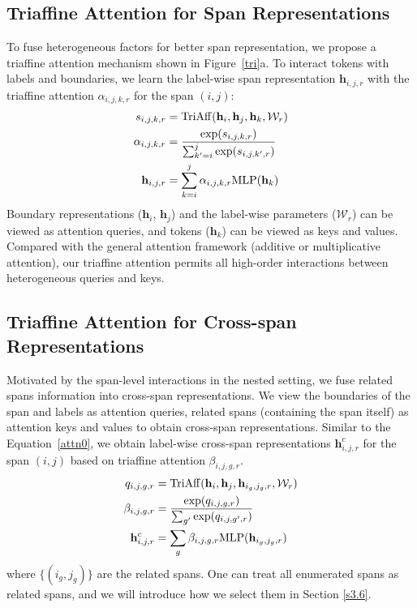 \documentclass[11pt]{article}
\begin{document}
\subsection{Triaffine Attention for Span Representations} \label{triaffine}

To fuse heterogeneous factors for better span representation, we propose a triaffine attention mechanism shown in Figure~\ref{tri}a. 
To interact tokens with labels and boundaries, we learn the label-wise span representation $\mathbf{h}_{i,j,r}$ with the triaffine attention $\alpha_{i,j,k,r}$ for the span $(i,j)$:
\begin{align}
    s_{i,j,k,r} & = {\rm TriAff}(\mathbf{h}_i, \mathbf{h}_j, \mathbf{h}_k, {\mathcal W}_r) \\
\alpha_{i,j,k,r} & = \frac{\exp(s_{i,j,k,r})}{\sum_{k'=i}^j \exp (s_{i,j,k',r})} \\
\mathbf{h}_{i,j,r} & = \sum_{k=i}^j\alpha_{i,j,k,r}{\rm MLP}(\mathbf{h}_k)
\label{attn0}
\end{align}
Boundary representations ($\mathbf{h}_i$, $\mathbf{h}_j$) and the label-wise parameters (${\mathcal W}_r$) can be viewed as attention queries, and tokens ($\mathbf{h}_k$) can be viewed as keys and values.
Compared with the general attention framework (additive or multiplicative attention), our triaffine attention permits all high-order interactions between heterogeneous queries and keys.










\subsection{Triaffine Attention for Cross-span Representations}
Motivated by the span-level interactions in the nested setting,
we fuse related spans information 
into cross-span representations.
We view the boundaries of the span and labels as attention queries, related spans (containing the span itself) as attention keys and values to obtain cross-span representations.
Similar to the Equation~\ref{attn0}, we obtain label-wise cross-span representations $\mathbf{h}^c_{i,j,r}$ for the span $(i,j)$ based on triaffine attention $\beta_{i,j,g,r}$.
\begin{align}
    q_{i,j,g,r} &= {\rm TriAff}(\mathbf{h}_{i}, \mathbf{h}_{j}, \mathbf{h}_{i_g,j_g,r}, {\mathcal W}_r) \\
\beta_{i,j,g,r} &= \frac{\exp(q_{i,j,g,r})}{\sum_{g'}\exp(q_{i,j,g',r})} \\
\mathbf{h}^c_{i,j,r} &= \sum_g\beta_{i,j,g,r}{\rm MLP}(\mathbf{h}_{i_g,j_g,r})
\end{align}
where $\{(i_g,j_g)\}$ are the related spans. One can treat all enumerated spans as related spans, and we will introduce how we select them in Section \ref{s3.6}.
\end{document}
